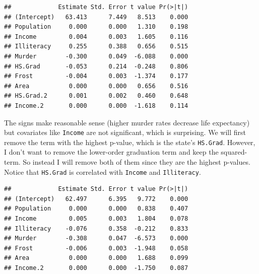 \documentclass[]{book}
\newenvironment{Shaded}{\begin{snugshade}}{\end{snugshade}}
\newcommand{\KeywordTok}[1]{\textcolor[rgb]{0.13,0.29,0.53}{\textbf{{#1}}}}
\newcommand{\DataTypeTok}[1]{\textcolor[rgb]{0.13,0.29,0.53}{{#1}}}
\newcommand{\DecValTok}[1]{\textcolor[rgb]{0.00,0.00,0.81}{{#1}}}
\newcommand{\FloatTok}[1]{\textcolor[rgb]{0.00,0.00,0.81}{{#1}}}
\newcommand{\StringTok}[1]{\textcolor[rgb]{0.31,0.60,0.02}{{#1}}}
\newcommand{\CommentTok}[1]{\textcolor[rgb]{0.56,0.35,0.01}{\textit{{#1}}}}
\newcommand{\NormalTok}[1]{{#1}}
\theoremstyle{definition}
\theoremstyle{definition}
\theoremstyle{remark}
\begin{document}
\begin{verbatim}
##             Estimate Std. Error t value Pr(>|t|)
## (Intercept)   63.413      7.449   8.513    0.000
## Population     0.000      0.000   1.310    0.198
## Income         0.004      0.003   1.605    0.116
## Illiteracy     0.255      0.388   0.656    0.515
## Murder        -0.300      0.049  -6.088    0.000
## HS.Grad       -0.053      0.214  -0.248    0.806
## Frost         -0.004      0.003  -1.374    0.177
## Area           0.000      0.000   0.656    0.516
## HS.Grad.2      0.001      0.002   0.460    0.648
## Income.2       0.000      0.000  -1.618    0.114
\end{verbatim}

The signs make reasonable sense (higher murder rates decrease life
expectancy) but covariates like \texttt{Income} are not significant,
which is surprising. We will first remove the term with the highest
p-value, which is the state's \texttt{HS.Grad}. However, I don't want to
remove the lower-order graduation term and keep the squared-term. So
instead I will remove both of them since they are the highest p-values.
Notice that \texttt{HS.Grad} is correlated with \texttt{Income} and
\texttt{Illiteracy}.

\begin{Shaded}
\end{Shaded}

\begin{verbatim}
##             Estimate Std. Error t value Pr(>|t|)
## (Intercept)   62.497      6.395   9.772    0.000
## Population     0.000      0.000   0.838    0.407
## Income         0.005      0.003   1.804    0.078
## Illiteracy    -0.076      0.358  -0.212    0.833
## Murder        -0.308      0.047  -6.573    0.000
## Frost         -0.006      0.003  -1.948    0.058
## Area           0.000      0.000   1.688    0.099
## Income.2       0.000      0.000  -1.750    0.087
\end{verbatim}

\begin{Shaded}
\end{Shaded}
\end{document}
